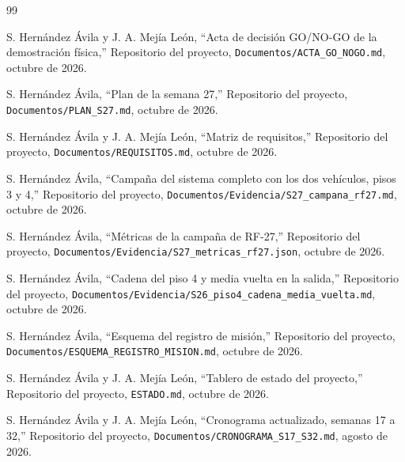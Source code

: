 \documentclass[12pt,letterpaper]{article}
\begin{document}
\begin{thebibliography}{99}

S. Hernández Ávila y J. A. Mejía León,
``Acta de decisión GO/NO-GO de la demostración física,''
Repositorio del proyecto, \texttt{Documentos/ACTA\_GO\_NOGO.md}, octubre de 2026.

S. Hernández Ávila,
``Plan de la semana 27,''
Repositorio del proyecto, \texttt{Documentos/PLAN\_S27.md}, octubre de 2026.

S. Hernández Ávila y J. A. Mejía León,
``Matriz de requisitos,''
Repositorio del proyecto, \texttt{Documentos/REQUISITOS.md}, octubre de 2026.

S. Hernández Ávila,
``Campaña del sistema completo con los dos vehículos, pisos 3 y 4,''
Repositorio del proyecto, \texttt{Documentos/Evidencia/S27\_campana\_rf27.md}, octubre de 2026.

S. Hernández Ávila,
``Métricas de la campaña de RF-27,''
Repositorio del proyecto, \texttt{Documentos/Evidencia/S27\_metricas\_rf27.json}, octubre de 2026.

S. Hernández Ávila,
``Cadena del piso 4 y media vuelta en la salida,''
Repositorio del proyecto, \texttt{Documentos/Evidencia/S26\_piso4\_cadena\_media\_vuelta.md}, octubre de 2026.

S. Hernández Ávila,
``Esquema del registro de misión,''
Repositorio del proyecto, \texttt{Documentos/ESQUEMA\_REGISTRO\_MISION.md}, octubre de 2026.

S. Hernández Ávila y J. A. Mejía León,
``Tablero de estado del proyecto,''
Repositorio del proyecto, \texttt{ESTADO.md}, octubre de 2026.

S. Hernández Ávila y J. A. Mejía León,
``Cronograma actualizado, semanas 17 a 32,''
Repositorio del proyecto, \texttt{Documentos/CRONOGRAMA\_S17\_S32.md}, agosto de 2026.

\end{thebibliography}
\end{document}
